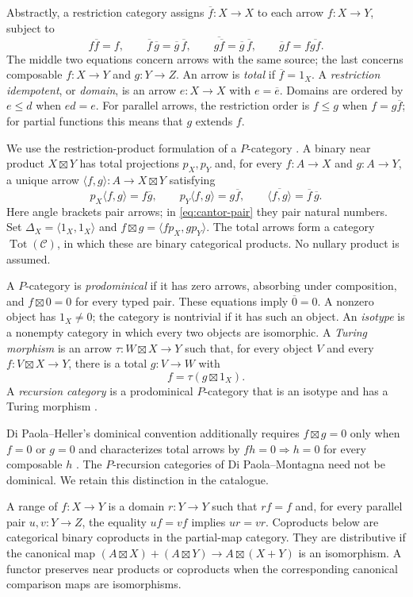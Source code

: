 \documentclass[11pt]{article}
\theoremstyle{definition}
\newcommand{\C}{\mathcal C}
\newcommand{\Tot}{\operatorname{Tot}}
\begin{document}
Abstractly, a restriction category assigns $\overline f:X\to X$
to each arrow $f:X\to Y$, subject to
\[
 f\overline f=f,\qquad
 \overline f\,\overline g=\overline g\,\overline f,\qquad
 \overline{g\overline f}=\overline g\,\overline f,\qquad
 \overline g f=f\overline{gf}.
\]
The middle two equations concern arrows with the same source; the
last concerns composable $f:X\to Y$ and $g:Y\to Z$.
An arrow is \emph{total} if $\overline f=1_X$.
A \emph{restriction idempotent}, or \emph{domain}, is an arrow
$e:X\to X$ with $e=\overline e$. Domains are ordered by
$e\leq d$ when $ed=e$. For parallel arrows, the restriction order
is $f\leq g$ when $f=g\overline f$; for partial functions this
means that $g$ extends $f$.

We use the restriction-product formulation of a $P$-category
\cite[Proposition 4.5]{CL3}. A binary near product
$X\boxtimes Y$ has total projections $p_X,p_Y$ and, for every
$f:A\to X$ and $g:A\to Y$, a unique arrow
$\langle f,g\rangle:A\to X\boxtimes Y$ satisfying
\[
 p_X\langle f,g\rangle=f\overline g,\qquad
 p_Y\langle f,g\rangle=g\overline f,\qquad
 \overline{\langle f,g\rangle}=\overline f\,\overline g.
\]
Here angle brackets pair arrows; in \eqref{eq:cantor-pair} they
pair natural numbers. Set $\Delta_X=\langle1_X,1_X\rangle$ and
$f\boxtimes g=\langle fp_X,gp_Y\rangle$.
The total arrows form a category $\Tot(\C)$, in which these are
binary categorical products. No nullary product is assumed.

A $P$-category is \emph{prodominical} if it has zero arrows,
absorbing under composition, and $f\boxtimes0=0$ for every typed
pair. These equations imply $\overline0=0$. A nonzero object has
$1_X\ne0$; the category is nontrivial if it has such an object.
An \emph{isotype} is a nonempty category in which every two objects
are isomorphic. A \emph{Turing morphism} is an arrow
$\tau:W\boxtimes X\to Y$ such that, for every object $V$ and
every $f:V\boxtimes X\to Y$, there is a total $g:V\to W$ with
\[
 f=\tau(g\boxtimes1_X).
\]
A \emph{recursion category} is a prodominical $P$-category that is
an isotype and has a Turing morphism \cite[\S9]{Heller}.

Di Paola--Heller's dominical convention additionally requires
$f\boxtimes g=0$ only when $f=0$ or $g=0$ and characterizes total
arrows by $fh=0\Rightarrow h=0$ for every composable $h$
\cite[Definitions 2.0--2.3]{DPH}. The $P$-recursion categories
of Di Paola--Montagna need not be dominical. We retain this
distinction in the catalogue.

A range of $f:X\to Y$ is a domain $r:Y\to Y$ such that $rf=f$
and, for every parallel pair $u,v:Y\to Z$, the equality $uf=vf$
implies $ur=vr$. Coproducts below are categorical binary coproducts
in the partial-map category. They are distributive if the canonical map
$(A\boxtimes X)+(A\boxtimes Y)\to A\boxtimes(X+Y)$ is an
isomorphism. A functor preserves near products or coproducts when
the corresponding canonical comparison maps are isomorphisms.
\end{document}
